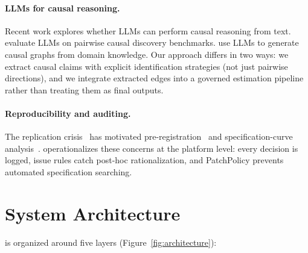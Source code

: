 \documentclass{article}
\begin{document}
\paragraph{LLMs for causal reasoning.}
Recent work explores whether LLMs can perform causal reasoning from text. \citet{kiciman2023causal} evaluate LLMs on pairwise causal discovery benchmarks. \citet{long2023can} use LLMs to generate causal graphs from domain knowledge. Our approach differs in two ways: we extract causal claims with explicit identification strategies (not just pairwise directions), and we integrate extracted edges into a governed estimation pipeline rather than treating them as final outputs.

\paragraph{Reproducibility and auditing.}
The replication crisis~\citep{ioannidis2005why} has motivated pre-registration~\citep{nosek2018preregistration} and specification-curve analysis~\citep{simonsohn2020specification}. \oc{} operationalizes these concerns at the platform level: every decision is logged, issue rules catch post-hoc rationalization, and PatchPolicy prevents automated specification searching.

\section{System Architecture}
\label{sec:architecture}

\oc{} is organized around five layers (Figure~\ref{fig:architecture}):
\end{document}
